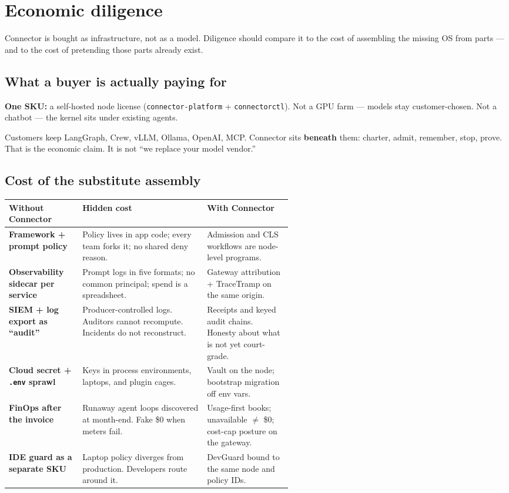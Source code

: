 \documentclass[10pt]{article}
\begin{document}
\section{Economic diligence}

Connector is bought as infrastructure, not as a model. Diligence should compare it to the cost of assembling the missing OS from parts --- and to the cost of pretending those parts already exist.

\subsection{What a buyer is actually paying for}

\textbf{One SKU:} a self-hosted node license (\texttt{connector-platform} + \texttt{connectorctl}). Not a GPU farm --- models stay customer-chosen. Not a chatbot --- the kernel sits under existing agents.

Customers keep LangGraph, Crew, vLLM, Ollama, OpenAI, MCP. Connector sits \textbf{beneath} them: charter, admit, remember, stop, prove. That is the economic claim. It is not ``we replace your model vendor.''

\subsection{Cost of the substitute assembly}

\renewcommand{\arraystretch}{1.14}
{\small
\begin{tabularx}{\linewidth}{@{}>{\bfseries\arraybackslash}p{0.26\linewidth} X >{\raggedright\arraybackslash}p{0.30\linewidth}@{}}
\toprule
Without Connector & Hidden cost & With Connector \\
\midrule
Framework + prompt policy & Policy lives in app code; every team forks it; no shared deny reason. & Admission and CLS workflows are node-level programs. \\
Observability sidecar per service & Prompt logs in five formats; no common principal; spend is a spreadsheet. & Gateway attribution + TraceTramp on the same origin. \\
SIEM + log export as ``audit'' & Producer-controlled logs. Auditors cannot recompute. Incidents do not reconstruct. & Receipts and keyed audit chains. Honesty about what is not yet court-grade. \\
Cloud secret + \texttt{.env} sprawl & Keys in process environments, laptops, and plugin cages. & Vault on the node; bootstrap migration off env vars. \\
FinOps after the invoice & Runaway agent loops discovered at month-end. Fake \$0 when meters fail. & Usage-first books; unavailable $\neq$ \$0; cost-cap posture on the gateway. \\
IDE guard as a separate SKU & Laptop policy diverges from production. Developers route around it. & DevGuard bound to the same node and policy IDs. \\
\bottomrule
\end{tabularx}}
\end{document}
